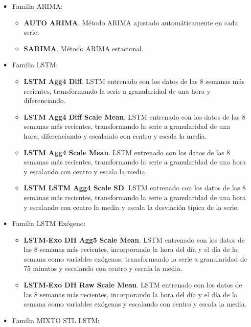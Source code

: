 \documentclass[]{book}
\providecommand{\tightlist}{%
  \setlength{\itemsep}{0pt}\setlength{\parskip}{0pt}}
\begin{document}
\begin{itemize}
\tightlist
\item
  Familia ARIMA:

  \begin{itemize}
  \tightlist
  \item
    \textbf{AUTO ARIMA}. Método ARIMA ajustado automáticamente en cada
    serie.
  \item
    \textbf{SARIMA}. Método ARIMA estacional.
  \end{itemize}
\item
  Familia LSTM:

  \begin{itemize}
  \tightlist
  \item
    \textbf{LSTM Agg4 Diff}. LSTM entrenado con los datos de las 8
    semanas más recientes, transformando la serie a granularidad de una
    hora y diferenciando.
  \item
    \textbf{LSTM Agg4 Diff Scale Mean}. LSTM entrenado con los datos de
    las 8 semanas más recientes, transformando la serie a granularidad
    de una hora, diferenciando y escalando con centro y escala la media.
  \item
    \textbf{LSTM Agg4 Scale Mean}. LSTM entrenado con los datos de las 8
    semanas más recientes, transformando la serie a granularidad de una
    hora y escalando con centro y escala la media.
  \item
    \textbf{LSTM LSTM Agg4 Scale SD}. LSTM entrenado con los datos de
    las 8 semanas más recientes, transformando la serie a granularidad
    de una hora y escalando con centro la media y escala la desviación
    típica de la serie.
  \end{itemize}
\item
  Familia LSTM Exógeno:

  \begin{itemize}
  \tightlist
  \item
    \textbf{LSTM-Exo DH Agg5 Scale Mean}. LSTM entrenado con los datos
    de las 8 semanas más recientes, incorporando la hora del día y el
    día de la semana como variables exógenas, transformando la serie a
    granularidad de 75 minutos y escalando con centro y escala la media.
  \item
    \textbf{LSTM-Exo DH Raw Scale Mean}. LSTM entrenado con los datos de
    las 8 semanas más recientes, incorporando la hora del día y el día
    de la semana como variables exógenas y escalando con centro y escala
    la media.
  \end{itemize}
\item
  Familia MIXTO STL LSTM:


\end{itemize}
\end{document}
